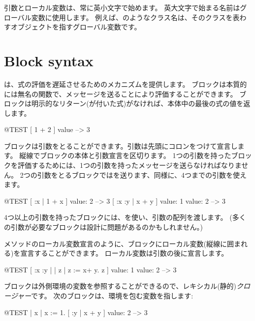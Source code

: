 \documentclass[a4paper,10pt,twoside]{book}
\begin{document}
引数とローカル変数は、常に英小文字で始めます。
英大文字で始まる名前はグローバル変数に使用します。
例えば、のようなクラス名は、そのクラスを表わすオブジェクトを指すグローバル変数です。

\section{Block syntax}

は、式の評価を遅延させるためのメカニズムを提供します。
ブロックは本質的には無名の関数で、メッセージを送ることにより評価することができます。
ブロックは明示的なリターン(\ct{^}が付いた式)がなければ、本体中の最後の式の値を返します。

\begin{code}{@TEST}
[ 1 + 2 ] value --> 3
\end{code}

ブロックは引数をとることができます。引数は先頭にコロンをつけて宣言します。
縦線でブロックの本体と引数宣言を区切ります。
1つの引数を持ったブロックを評価するためには、1つの引数を持ったメッセージを送らなければなりません。
2つの引数をとるブロックではを送ります、同様に、4つまでの引数を使えます。

\begin{code}{@TEST}
[ :x | 1 + x ] value: 2 --> 3
[ :x :y | x + y ] value: 1 value: 2 --> 3
\end{code}

4つ以上の引数を持ったブロックには、を使い、引数の配列を渡します。
(多くの引数が必要なブロックは設計に問題があるのかもしれません。)

メソッドのローカル変数宣言のように、ブロックにローカル変数(縦線に囲まれる)を宣言することができます。
ローカル変数は引数の後に宣言します。

\begin{code}{@TEST}
[ :x :y | | z | z := x+ y. z ] value: 1 value: 2 --> 3
\end{code}

ブロックは外側環境の変数を参照することができるので、レキシカル(静的)\emph{クロージャー}です。
次のブロックは、環境を包む変数を指します:

\begin{code}{@TEST}
| x |
x := 1.
[ :y | x + y ] value: 2 --> 3
\end{code}
\end{document}
